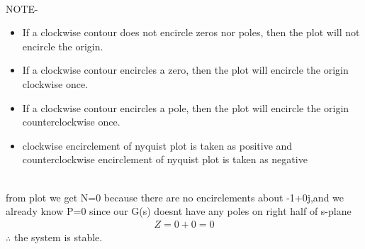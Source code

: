 \begin{enumerate}[label=\thesection.\arabic*.,ref=\thesection.\theenumi]
\begin{tabular}{ |p{4cm}||p{4cm}|  }
 \hline
\end{tabular}
\\
\newline NOTE-
\begin{itemize}
\item If a clockwise contour does not encircle zeros nor poles, then the plot will not encircle the origin.
\item If a clockwise contour encircles a zero, then the plot will encircle the origin clockwise once.
\item If a clockwise contour encircles a pole, then the plot will encircle the origin counterclockwise once.
\item clockwise encirclement of nyquist plot is taken as positive and  counterclockwise encirclement of nyquist plot is taken as negative
\end{itemize}
\\
\newline from plot we get N=0 because there are no encirclements about -1+0j,and we already know P=0 since our G(s) doesnt have any poles on right half of s-plane
\begin{align}
Z=0+0=0
\end{align}
$\therefore$ the system is stable.



\end{enumerate}
